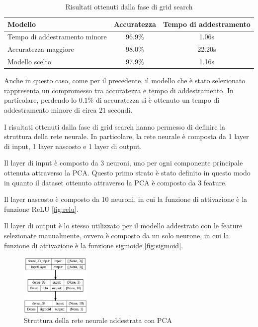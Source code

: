 \begin{table}[ht]
    \centering
    \begin{tabular}{@{}lcc@{}}
        \toprule
        \rowcolor[HTML]{EFEFEF}
        \textbf{Modello}              & \textbf{Accuratezza} & \textbf{Tempo di addestramento} \\ \midrule
        Tempo di addestramento minore & 96.9\%               & 1.06s                           \\
        Accuratezza maggiore          & 98.0\%               & 22.20s                          \\
        Modello scelto                & 97.9\%               & 1.16s                           \\ \bottomrule
    \end{tabular}
    \caption{Risultati ottenuti dalla fase di grid search}
    \label{tab:ris-grid-search-pca}
\end{table}
Anche in questo caso, come per il precedente, il modello che è stato selezionato
rappresenta un compromesso tra accuratezza e tempo di addestramento. In particolare,
perdendo lo $0.1\%$ di accuratezza si è ottenuto un tempo di addestramento minore
di circa $21$ secondi.


I risultati ottenuti dalla fase di grid search hanno permesso di definire la
struttura della rete neurale. In particolare, la rete neurale è composta da 1
layer di input, 1 layer nascosto e 1 layer di output.

Il layer di input è composto da 3 neuroni, uno per ogni componente principale
ottenuta attraverso la PCA. Questo primo strato è stato definito in questo modo
in quanto il dataset ottenuto attraverso la PCA è composto da 3 feature.

Il layer nascosto è composto da 10 neuroni, in cui la funzione di attivazione è
la funzione ReLU \ref{fig:relu}.

Il layer di output è lo stesso utilizzato per il modello addestrato con le feature
selezionate manualmente, ovvero è composto da un solo neurone, in cui la funzione
di attivazione è la funzione sigmoide \ref{fig:sigmoid}.
\begin{figure}[!ht]
    \centering
    \includegraphics[width=0.3\textwidth]{img/rete/struttura_rete_pca.png}
    \caption{Struttura della rete neurale addestrata con PCA}
    \label{fig:strutturaReteNeuralePCA}
\end{figure}